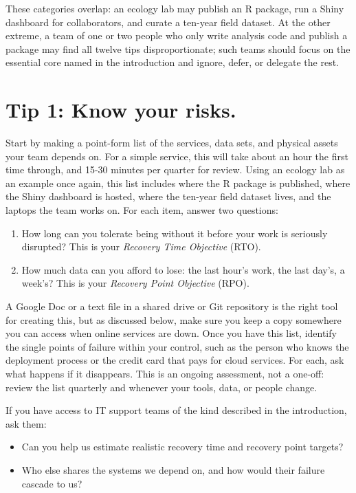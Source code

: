 \documentclass[10pt,letterpaper]{article}
\begin{document}
These categories overlap: an ecology lab may publish an R package, run a Shiny
dashboard for collaborators, and curate a ten-year field dataset.  At the other
extreme, a team of one or two people who only write analysis code and publish a
package may find all twelve tips disproportionate; such teams should focus on
the essential core named in the introduction and ignore, defer, or delegate the
rest.

\section*{Tip 1: Know your risks.}

Start by making a point-form list of the services, data sets, and physical
assets your team depends on.  For a simple service, this will take about an hour
the first time through, and 15-30 minutes per quarter for review.  Using an
ecology lab as an example once again, this list includes where the R package is
published, where the Shiny dashboard is hosted, where the ten-year field dataset
lives, and the laptops the team works on. For each item, answer two questions:

\begin{enumerate}
  
\item
  How long can you tolerate being without it before your work is seriously
  disrupted? This is your \emph{Recovery Time Objective} (RTO).
  
\item
  How much data can you afford to lose: the last hour's work, the last
  day's, a week's? This is your \emph{Recovery Point Objective} (RPO).
  
\end{enumerate}

A Google Doc or a text file in a shared drive or Git repository is the right
tool for creating this, but as discussed below, make sure you keep a copy
somewhere you can access when online services are down.  Once you have this
list, identify the single points of failure within your control, such as the
person who knows the deployment process or the credit card that pays for cloud
services. For each, ask what happens if it disappears. This is an ongoing
assessment, not a one-off: review the list quarterly and whenever your tools,
data, or people change.

\begin{notebox}
  If you have access to IT support teams of the kind described in the introduction,
  ask them:
  \begin{itemize}
  \item Can you help us estimate realistic recovery time and recovery point targets?
  \item Who else shares the systems we depend on, and how would their failure cascade to us?
  \end{itemize}
\end{notebox}
\end{document}
